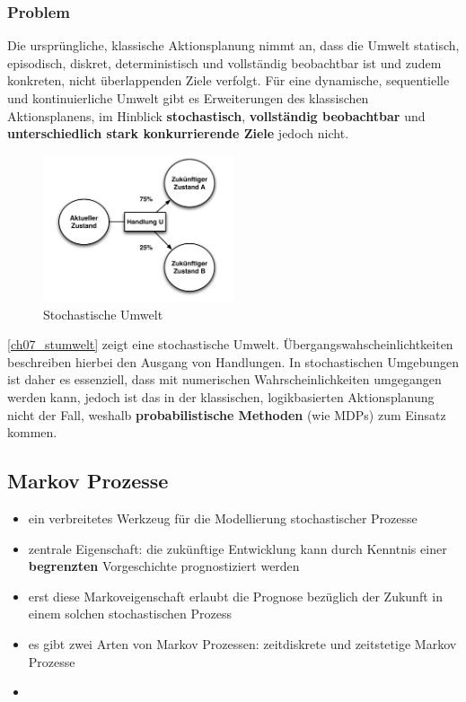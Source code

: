 \subsubsection{Problem}
Die urspr\"ungliche, klassische Aktionsplanung nimmt an, dass die Umwelt statisch, episodisch, diskret, deterministisch und vollst\"andig beobachtbar ist und zudem konkreten, nicht \"uberlappenden Ziele verfolgt. 
F\"ur eine dynamische, sequentielle und kontinuierliche Umwelt gibt es Erweiterungen des klassischen Aktionsplanens, im Hinblick \textbf{stochastisch}, \textbf{vollst\"andig beobachtbar} und \textbf{unterschiedlich stark konkurrierende Ziele} jedoch nicht.
%
\begin{figure}[ht]\centering 
\includegraphics[width=0.5\textwidth]{figures/ch07_stochastischeUmwelt.png}
\caption{Stochastische Umwelt}
\label{ch07_stumwelt}
\end{figure}

\autoref{ch07_stumwelt} zeigt eine stochastische Umwelt.
\"Ubergangswahscheinlichtkeiten beschreiben hierbei den Ausgang von Handlungen.
In stochastischen Umgebungen ist daher es essenziell, dass mit numerischen Wahrscheinlichkeiten umgegangen werden kann, jedoch ist das in der klassischen, logikbasierten Aktionsplanung nicht der Fall, weshalb \textbf{probabilistische Methoden} (wie MDPs) zum Einsatz kommen.

\subsection{Markov Prozesse}
\begin{itemize}
\item ein verbreitetes Werkzeug f\"ur die Modellierung stochastischer Prozesse
\item zentrale Eigenschaft: die zuk\"unftige Entwicklung kann durch Kenntnis einer \textbf{begrenzten} Vorgeschichte prognostiziert werden
\item erst diese Markoveigenschaft erlaubt die Prognose bez\"uglich der Zukunft in einem solchen stochastischen Prozess
\item es gibt zwei Arten von Markov Prozessen: zeitdiskrete und zeitstetige Markov Prozesse
\item 
\end{itemize}

